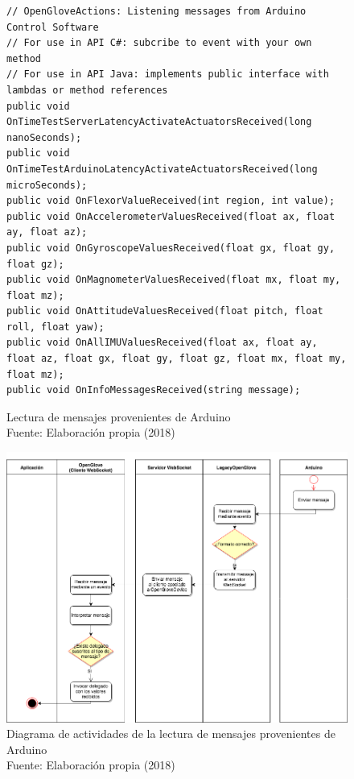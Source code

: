 \begin{figure}[H]
  \begin{center}
\begin{lstlisting}
// OpenGloveActions: Listening messages from Arduino Control Software
// For use in API C#: subcribe to event with your own method
// For use in API Java: implements public interface with lambdas or method references
public void OnTimeTestServerLatencyActivateActuatorsReceived(long nanoSeconds);
public void OnTimeTestArduinoLatencyActivateActuatorsReceived(long microSeconds);
public void OnFlexorValueReceived(int region, int value);
public void OnAccelerometerValuesReceived(float ax, float ay, float az);
public void OnGyroscopeValuesReceived(float gx, float gy, float gz);
public void OnMagnometerValuesReceived(float mx, float my, float mz);
public void OnAttitudeValuesReceived(float pitch, float roll, float yaw);
public void OnAllIMUValuesReceived(float ax, float ay, float az, float gx, float gy, float gz, float mx, float my, float mz);
public void OnInfoMessagesReceived(string message);
\end{lstlisting}
   	\captionsetup{justification=centering}
    \caption[Lectura de mensajes provenientes de Arduino]{Lectura de mensajes provenientes de Arduino\\Fuente: Elaboración propia (2018)}
    \label{fig:methods-4-listening-arduino}
  \end{center}
\end{figure}

\begin{figure}[H]
  \begin{center} 
   	\includegraphics[width=1.0\textwidth]{images/chapter04/ActivityDiagrams-ListeningMessagesFromArduino.png} 
   	\captionsetup{justification=centering}
    \caption[Diagrama de actividades de la lectura de mensajes provenientes de Arduino]{Diagrama de actividades de la lectura de mensajes provenientes de Arduino\\Fuente: Elaboración propia (2018)}
    \label{fig:activity-diagrams-4-ListeningMessagesFromArduino}
  \end{center}
\end{figure}

